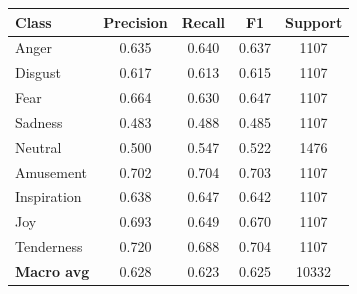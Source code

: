 \begin{tabular}{lcccc}
\toprule
Class & Precision & Recall & F1 & Support \\
\midrule
Anger & 0.635 & 0.640 & 0.637 & 1107 \\
Disgust & 0.617 & 0.613 & 0.615 & 1107 \\
Fear & 0.664 & 0.630 & 0.647 & 1107 \\
Sadness & 0.483 & 0.488 & 0.485 & 1107 \\
Neutral & 0.500 & 0.547 & 0.522 & 1476 \\
Amusement & 0.702 & 0.704 & 0.703 & 1107 \\
Inspiration & 0.638 & 0.647 & 0.642 & 1107 \\
Joy & 0.693 & 0.649 & 0.670 & 1107 \\
Tenderness & 0.720 & 0.688 & 0.704 & 1107 \\
\midrule
\textbf{Macro avg} & 0.628 & 0.623 & 0.625 & 10332 \\
\bottomrule
\end{tabular}
